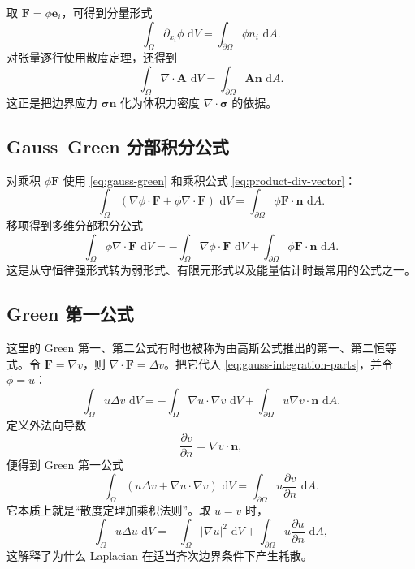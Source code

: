 \documentclass[cn,hazy,blue,11pt,normal]{elegantnote}
\numberwithin{equation}{section}
\newcommand{\dd}{\,\mathrm d}
\newcommand{\vct}[1]{\bm{#1}}
\newcommand{\ten}[1]{\bm{#1}}
\begin{document}
取 $\vct F=\phi\vct e_i$，可得到分量形式
\begin{equation}
 \boxed{\int_\Omega\partial_{x_i}\phi\,\dd V
 =\int_{\partial\Omega}\phi n_i\,\dd A.} \label{eq:gauss-component}
\end{equation}
对张量逐行使用散度定理，还得到
\begin{equation}
 \boxed{\int_\Omega\nabla\cdot\ten A\,\dd V
 =\int_{\partial\Omega}\ten A\vct n\,\dd A.} \label{eq:gauss-tensor}
\end{equation}
这正是把边界应力 $\ten\sigma\vct n$ 化为体积力密度 $\nabla\cdot\ten\sigma$ 的依据。

\subsection{Gauss--Green 分部积分公式}

对乘积 $\phi\vct F$ 使用 \eqref{eq:gauss-green} 和乘积公式 \eqref{eq:product-div-vector}：
\begin{equation}
 \int_\Omega(\nabla\phi\cdot\vct F+\phi\nabla\cdot\vct F)\,\dd V
 =\int_{\partial\Omega}\phi\vct F\cdot\vct n\,\dd A.
\end{equation}
移项得到多维分部积分公式
\begin{equation}
 \boxed{\int_\Omega\phi\nabla\cdot\vct F\,\dd V
 =-\int_\Omega\nabla\phi\cdot\vct F\,\dd V
 +\int_{\partial\Omega}\phi\vct F\cdot\vct n\,\dd A.} \label{eq:gauss-integration-parts}
\end{equation}
这是从守恒律强形式转为弱形式、有限元形式以及能量估计时最常用的公式之一。

\subsection{Green 第一公式}

这里的 Green 第一、第二公式有时也被称为由高斯公式推出的第一、第二恒等式。令 $\vct F=\nabla v$，则 $\nabla\cdot\vct F=\Delta v$。把它代入 \eqref{eq:gauss-integration-parts}，并令 $\phi=u$：
\begin{equation}
 \int_\Omega u\Delta v\,\dd V
 =-\int_\Omega\nabla u\cdot\nabla v\,\dd V
 +\int_{\partial\Omega}u\nabla v\cdot\vct n\,\dd A.
\end{equation}
定义外法向导数
\begin{equation}
 \frac{\partial v}{\partial n}=\nabla v\cdot\vct n,
\end{equation}
便得到 Green 第一公式
\begin{equation}
 \boxed{\int_\Omega
 (u\Delta v+\nabla u\cdot\nabla v)\,\dd V
 =\int_{\partial\Omega}u\frac{\partial v}{\partial n}\,\dd A.} \label{eq:green-first}
\end{equation}
它本质上就是“散度定理加乘积法则”。取 $u=v$ 时，
\begin{equation}
 \int_\Omega u\Delta u\,\dd V
 =-\int_\Omega|\nabla u|^2\,\dd V
 +\int_{\partial\Omega}u\frac{\partial u}{\partial n}\,\dd A,
\end{equation}
这解释了为什么 Laplacian 在适当齐次边界条件下产生耗散。
\end{document}
